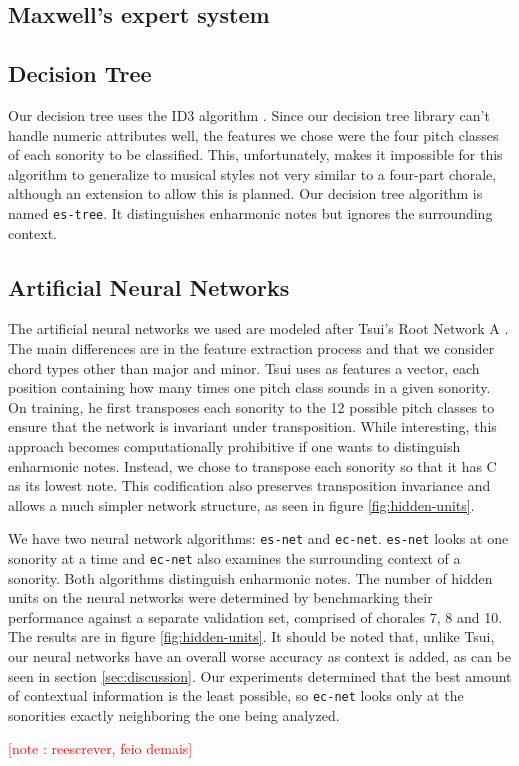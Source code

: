 \documentclass{article}
\newcounter{notecounter}
\newcommand{\note}[1]{
  \addtocounter{notecounter}{1}
  \textcolor{red}{[note \arabic{notecounter}: #1]}
}
\begin{document}
\subsection{Maxwell's expert system}
\label{sec:maxwell}


\subsection{Decision Tree}
\label{sec:tree}

Our decision tree uses the ID3 algorithm
\cite{mitchell:machine}. Since our decision tree library can't handle
numeric attributes well, the features we chose were the four pitch
classes of each sonority to be classified. This, unfortunately, makes
it impossible for this algorithm to generalize to musical styles not
very similar to a four-part chorale, although an extension to allow
this is planned. Our decision tree algorithm is named
\texttt{es-tree}. It distinguishes enharmonic notes but ignores the
surrounding context.

\subsection{Artificial Neural Networks}
\label{sec:neural-net}


The artificial neural networks we used are modeled after Tsui's Root
Network A \cite{tsui:harmonic}. The main differences are in the
feature extraction process and that we consider chord types other than
major and minor. Tsui uses as features a vector, each position
containing how many times one pitch class sounds in a given
sonority. On training, he first transposes each sonority to the 12
possible pitch classes to ensure that the network is invariant under
transposition. While interesting, this approach becomes
computationally prohibitive if one wants to distinguish enharmonic
notes. Instead, we chose to transpose each sonority so that it has C
as its lowest note. This codification also preserves transposition
invariance and allows a much simpler network structure, as seen in
figure \ref{fig:hidden-units}.

We have two neural network algorithms: \texttt{es-net} and
\texttt{ec-net}.  \texttt{es-net} looks at one sonority at a time and
\texttt{ec-net} also examines the surrounding context of a
sonority. Both algorithms distinguish enharmonic notes. The number of
hidden units on the neural networks were determined by benchmarking
their performance against a separate validation set, comprised of
chorales 7, 8 and 10. The results are in figure
\ref{fig:hidden-units}. It should be noted that, unlike Tsui, our
neural networks have an overall worse accuracy as context is added, as
can be seen in section \ref{sec:discussion}. Our experiments
determined that the best amount of contextual information is the least
possible, so \texttt{ec-net} looks only at the sonorities exactly
neighboring the one being analyzed. \note{reescrever, feio demais}
\end{document}
